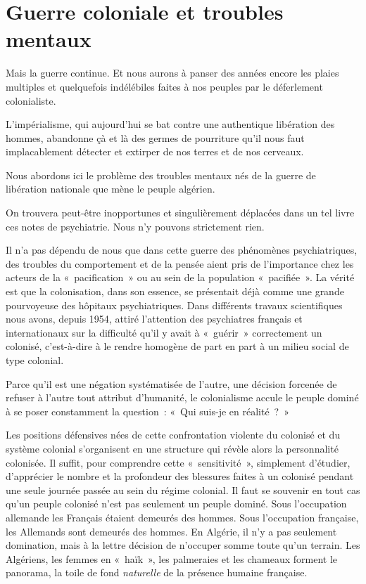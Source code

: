 \documentclass[french,twoside]{book} %
\begin{document}
\section[{Guerre coloniale et troubles mentaux}]{Guerre coloniale et troubles mentaux}
 \noindent Mais la guerre continue. Et nous aurons à panser des années encore les plaies multiples et quelquefois indélébiles faites à nos peuples par le déferlement colonialiste.\par
L’impérialisme, qui aujourd’hui se bat contre une authentique libération des hommes, abandonne çà et là des germes de pourriture qu’il nous faut implacablement détecter et extirper de nos terres et de nos cerveaux.\par
Nous abordons ici le problème des troubles mentaux nés de la guerre de libération nationale que mène le peuple algérien.\par
On trouvera peut-être inopportunes et singulièrement déplacées dans un tel livre ces notes de psychiatrie. Nous n’y pouvons strictement rien.\par
Il n’a pas dépendu de nous que dans cette guerre des phénomènes psychiatriques, des troubles du comportement et de la pensée aient pris de l’importance chez les acteurs de la « pacification » ou au sein de la population « pacifiée ». La vérité est que la colonisation, dans son essence, se présentait déjà comme une grande pourvoyeuse des hôpitaux psychiatriques. Dans différents travaux scientifiques nous avons, depuis 1954, attiré l’attention des psychiatres français et internationaux sur la difficulté qu’il y avait à « guérir » correctement un colonisé, c’est-à-dire à le rendre homogène de part en part à un milieu social de type colonial.\par
 Parce qu’il est une négation systématisée de l’autre, une décision forcenée de refuser à l’autre tout attribut d’humanité, le colonialisme accule le peuple dominé à se poser constamment la question : « Qui suis-je en réalité ? »\par
Les positions défensives nées de cette confrontation violente du colonisé et du système colonial s’organisent en une structure qui révèle alors la personnalité colonisée. Il suffit, pour comprendre cette « sensitivité », simplement d’étudier, d’apprécier le nombre et la profondeur des blessures faites à un colonisé pendant une seule journée passée au sein du régime colonial. Il faut se souvenir en tout cas qu’un peuple colonisé n’est pas seulement un peuple dominé. Sous l’occupation allemande les Français étaient demeurés des hommes. Sous l’occupation française, les Allemands sont demeurés des hommes. En Algérie, il n’y a pas seulement domination, mais à la lettre décision de n’occuper somme toute qu’un terrain. Les Algériens, les femmes en « haïk », les palmeraies et les chameaux forment le panorama, la toile de fond \emph{naturelle} de la présence humaine française.\par
\end{document}
